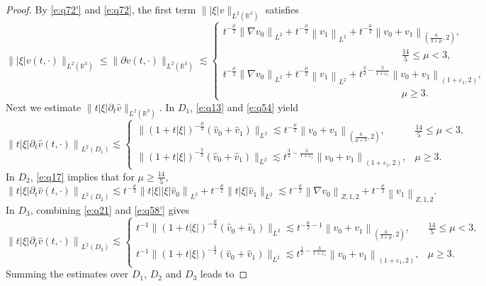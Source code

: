 \documentclass[11pt,twoside]{article}
\newcommand{\R}{\mathbb R}
\newcommand{\p}{\partial}
\newcommand{\f}{\frac}
\theoremstyle{plain}
\theoremstyle{definition}
\theoremstyle{remark}
\numberwithin{equation}{section}
\begin{document}
\begin{proof}
By \eqref{e:q72'} and \eqref{e:q72}, the first term  $\||\xi|v\|_{L^2(\R^3)}$ satisfies
\begin{equation}\label{e:q80}
\||\xi| v(t, \cdot)\|_{L^2(\R^3)}\leq\|\p v(t, \cdot)\|_{L^2(\R^3)} \lesssim \begin{cases} t^{-\f{\mu}{2}}\left\|\nabla v_0\right\|_{L^ 2}+t^{-\f{\mu}{2}}\left\| v_1\right\|_{L^ 2}+t^{-\f{\mu}{2}}\left\|v_0+v_1\right\|_{(\f{6}{3+\mu},2)},
\\ \qquad\qquad\qquad\qquad\qquad\qquad\qquad\qquad\qquad \f{14}{5}\leq\mu<3,\\ t^{-\f{\mu}{2}}\left\|\nabla v_0\right\|_{L^ 2}+t^{-\f{\mu}{2}}\left\| v_1\right\|_{L^ 2}+t^{\f32-\f{3}{1+\varepsilon_1}}\left\|v_0+v_1\right\|_{(1+\varepsilon_1,2)},\\ \qquad\qquad\qquad\qquad\qquad\qquad\qquad\qquad\qquad \mu\geq3.
\end{cases}
\end{equation}
Next we estimate  $\|t|\xi|\p_t\hat{v}\|_{L^2(\R^3)}$. In  $D_1$,   \eqref{e:q13} and \eqref{e:q54} yield
$$
\left\|t|\xi|\p_t\hat{v}(t, \cdot)\right\|_{L^2(D_1)}
\lesssim \begin{cases}\big\|(1+t|\xi|)^{-\f{\mu}{2}}(\hat{v}_{0}+\hat{v}_{1})\big\|_{L^2}
\lesssim t^{-\f{\mu}{2}}\left\|v_0+v_1\right\|_{(\f{6}{\mu+3},2)}, &  \f{14}{5}\leq\mu<3,  \\ \big\|(1+t|\xi|)^{-\f{3}{2}}(\hat{v}_{0}+\hat{v}_{1})\big\|_{L^2}
\lesssim t^{\f32-\f{3}{1+\varepsilon_1}}\left\|v_0+v_1\right\|_{(1+\varepsilon_1,2)},
&  \mu\geq3.\end{cases}
$$
In $D_2$,  \eqref{e:q17} implies that for $\mu\geq\f{14}{5}$,
$$
\left\|t|\xi|\p_t\hat{v}(t, \cdot)\right\|_{L^2(D_2)}
 \lesssim t^{-\frac{\mu}{2}}\left\|t|\xi||\xi|\hat{v}_{0}\right\|_{L^{2}}+t^{-\f{\mu}{2}} \|t|\xi|\hat{v}_{1}\|_{L^{2}} \lesssim t^{-\f{\mu}{2}}\left\|\nabla v_0\right\|_{Z,1,2}+t^{-\f{\mu}{2}}\left\|v_1\right\|_{Z,1,2}.
$$
In $D_3$, combining \eqref{e:q21} and \eqref{e:q58'} gives
$$
\left\|t|\xi|\p_t\hat{v}(t, \cdot)\right\|_{L^2(D_3)}
\lesssim \begin{cases}t^{-1}\big\|(1+t|\xi|)^{-\f{\mu}{2}}(\hat{v}_{0}+\hat{v}_{1})\big\|_{L^2}
\lesssim t^{-\f{\mu}{2}-1}\left\|v_0+v_1\right\|_{(\f{6}{3+\mu},2)}, &  \f{14}{5}\leq\mu<3,  \\ t^{-1}\big\|(1+t|\xi|)^{-\f{3}{2}}(\hat{v}_{0}+\hat{v}_{1})\big\|_{L^2}
\lesssim t^{\f12-\f{3}{1+\varepsilon_1}}\left\|v_0+v_1\right\|_{(1+\varepsilon_1,2)},
&  \mu\geq3.\end{cases}
$$
Summing the estimates over $D_1$, $D_2$ and $D_3$ leads to

\end{proof}
\end{document}
